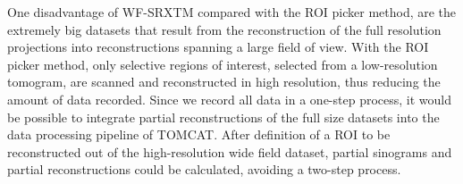 One disadvantage of WF-SRXTM compared with the ROI picker method, are the extremely big datasets that result from the reconstruction of the full resolution projections into reconstructions spanning a large field of view. With the ROI picker method, only selective regions of interest, selected from a low-resolution tomogram, are scanned and reconstructed in high resolution, thus reducing the amount of data recorded. Since we record all data in a one-step process, it would be possible to integrate partial reconstructions of the full size datasets into the data processing pipeline of TOMCAT. After definition of a ROI to be reconstructed out of the high-resolution wide field dataset, partial sinograms and partial reconstructions could be calculated, avoiding a two-step process. 